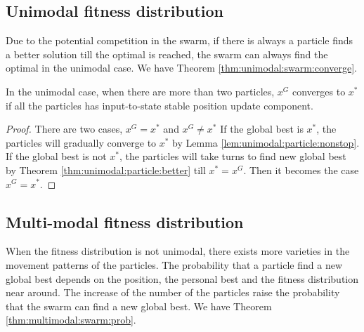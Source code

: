 \subsection{Unimodal fitness distribution}

Due to the potential competition in the swarm, if there is always a particle finds a better solution till the optimal is reached, the swarm can always find the optimal in the unimodal case.
We have Theorem \ref{thm:unimodal:swarm:converge}.

\begin{mythm}
\label{thm:unimodal:swarm:converge}
In the unimodal case, when there are more than two particles, $ x^{G} $ converges to $ x^{*} $ if all the particles has input-to-state stable position update component.
\begin{proof}
There are two cases, $ x^{G} = x^{*} $ and $ x^{G} \not = x^{*} $
If the global best is $ x^{*} $, the particles will gradually converge to $ x^{*} $ by Lemma \ref{lem:unimodal:particle:nonstop}.
If the global best is not $ x^{*} $, the particles will take turns to find new global best by Theorem \ref{thm:unimodal:particle:better} till $ x^{*} = x^{G} $.
Then it becomes the case $ x^{G} = x^{*} $.
\end{proof}
\end{mythm}



\subsection{Multi-modal fitness distribution}

When the fitness distribution is not unimodal, there exists more varieties in the movement patterns of the particles.
The probability that a particle find a new global best depends on the position, the personal best and the fitness distribution near around.
The increase of the number of the particles raise the probability that the swarm can find a new global best.
We have Theorem \ref{thm:multimodal:swarm:prob}.

